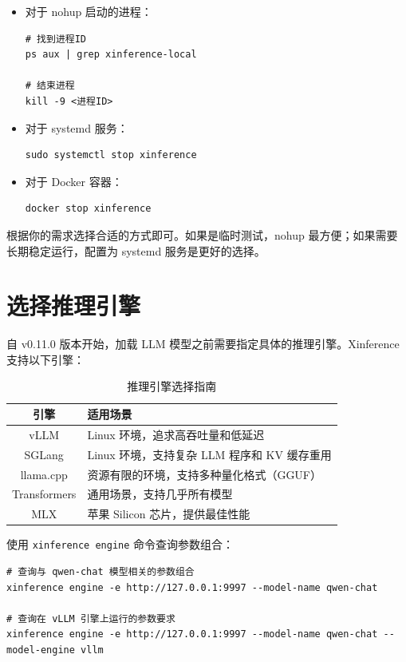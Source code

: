 \documentclass[12pt,UTF8]{ctexbook}
\begin{document}
\begin{itemize}[leftmargin=2cm]
    \item 对于 nohup 启动的进程：
        \begin{lstlisting}
# 找到进程ID
ps aux | grep xinference-local

# 结束进程
kill -9 <进程ID>
        \end{lstlisting}
    \item 对于 systemd 服务：
        \begin{lstlisting}
sudo systemctl stop xinference
        \end{lstlisting}
    \item 对于 Docker 容器：
        \begin{lstlisting}
docker stop xinference
        \end{lstlisting}
\end{itemize}

根据你的需求选择合适的方式即可。如果是临时测试，nohup 最方便；如果需要长期稳定运行，配置为 systemd 服务是更好的选择。

\section{选择推理引擎}
\label{sec:choose_engine}

自 v0.11.0 版本开始，加载 LLM 模型之前需要指定具体的推理引擎。Xinference 支持以下引擎：

\begin{table}[htbp]
    \centering
    \caption{推理引擎选择指南}
    \begin{tabular}{|c|p{8cm}|}
        \hline
        \textbf{引擎} & \textbf{适用场景} \\
        \hline
        vLLM & Linux 环境，追求高吞吐量和低延迟 \\
        \hline
        SGLang & Linux 环境，支持复杂 LLM 程序和 KV 缓存重用 \\
        \hline
        llama.cpp & 资源有限的环境，支持多种量化格式（GGUF） \\
        \hline
        Transformers & 通用场景，支持几乎所有模型 \\
        \hline
        MLX & 苹果 Silicon 芯片，提供最佳性能 \\
        \hline
    \end{tabular}
\end{table}

使用 \texttt{xinference engine} 命令查询参数组合：

\begin{lstlisting}
# 查询与 qwen-chat 模型相关的参数组合
xinference engine -e http://127.0.0.1:9997 --model-name qwen-chat

# 查询在 vLLM 引擎上运行的参数要求
xinference engine -e http://127.0.0.1:9997 --model-name qwen-chat --model-engine vllm
\end{lstlisting}
\end{document}
